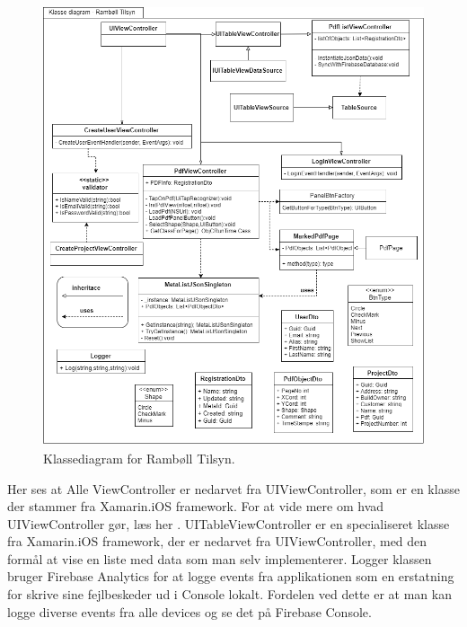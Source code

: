 \begin{figure}[H] %
	\centering
	\includegraphics[height=13cm, width=17cm]{../ArkitekturDesign/OverordnetArkitektur/KlasseDiagram}
	\caption{Klassediagram for Rambøll Tilsyn.}
	\label{fig:KlasseDiagram}
\end{figure}

Her ses at Alle ViewController er nedarvet fra UIViewController, som er en klasse der stammer fra Xamarin.iOS framework. For at vide mere om hvad UIViewController gør, læs her \cite{UIViewController}. UITableViewController er en specialiseret  klasse fra Xamarin.iOS framework, der er nedarvet fra UIViewController, med den formål at vise en liste med data som man selv implementerer. Logger klassen bruger Firebase Analytics for at logge events fra applikationen som en erstatning for skrive sine fejlbeskeder ud i Console lokalt\cite{CON}. Fordelen ved dette er at man kan logge diverse events fra alle devices og se det på Firebase Console.  
